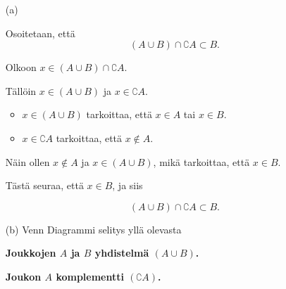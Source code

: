 \documentclass{article}
\begin{document}
\begin{enumerate}
	
\item[(a)]

Osoitetaan, että
\[
(A \cup B) \cap \complement A \subset B.
\]

Olkoon \(x \in (A \cup B) \cap \complement A\).

Tällöin \(x \in (A \cup B)\) ja \(x \in \complement A\).

\begin{itemize}
	\item \(x \in (A \cup B)\) tarkoittaa, että \(x \in A\) tai \(x \in B\).
	\item \(x \in \complement A\) tarkoittaa, että \(x \notin A\).
\end{itemize}

Näin ollen \(x \notin A\) ja \(x \in (A \cup B)\), mikä tarkoittaa, että \(x \in B\).

Tästä seuraa, että \(x \in B\), ja siis

\[
(A \cup B) \cap \complement A \subset B.
\]


\item[(b)]
Venn Diagrammi selitys yllä olevasta

\textbf{Joukkojen $A$ ja $B$ yhdistelmä $(A \cup B)$.}


\newpage  %

\textbf{Joukon $A$ komplementti $(\complement A)$.}

\end{enumerate}
\end{document}
